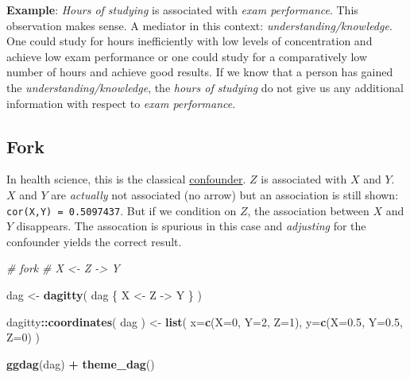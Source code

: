 \documentclass[
]{book}
\newenvironment{Shaded}{\begin{snugshade}}{\end{snugshade}}
\newcommand{\AttributeTok}[1]{\textcolor[rgb]{0.13,0.29,0.53}{#1}}
\newcommand{\CommentTok}[1]{\textcolor[rgb]{0.56,0.35,0.01}{\textit{#1}}}
\newcommand{\DecValTok}[1]{\textcolor[rgb]{0.00,0.00,0.81}{#1}}
\newcommand{\FloatTok}[1]{\textcolor[rgb]{0.00,0.00,0.81}{#1}}
\newcommand{\FunctionTok}[1]{\textcolor[rgb]{0.13,0.29,0.53}{\textbf{#1}}}
\newcommand{\NormalTok}[1]{#1}
\newcommand{\OtherTok}[1]{\textcolor[rgb]{0.56,0.35,0.01}{#1}}
\newcommand{\SpecialCharTok}[1]{\textcolor[rgb]{0.81,0.36,0.00}{\textbf{#1}}}
\newcommand{\StringTok}[1]{\textcolor[rgb]{0.31,0.60,0.02}{#1}}
\begin{document}
\textbf{Example}: \emph{Hours of studying} is associated with \emph{exam performance}.
This observation makes sense. A mediator in this context: \emph{understanding/knowledge}.
One could study for hours inefficiently with low levels of concentration
and achieve low exam performance or one could study for a comparatively
low number of hours and achieve good results. If we know that a person has gained the
\emph{understanding/knowledge}, the \emph{hours of studying} do not give us any additional
information with respect to \emph{exam performance}.

\subsection{Fork}\label{fork}

In health science, this is the classical \href{https://en.wikipedia.org/wiki/Confounding}{confounder}.
\(Z\) is associated with \(X\) and \(Y\). \(X\) and \(Y\) are \emph{actually} not associated (no arrow) but an association is
still shown: \texttt{cor(X,Y)\ =\ 0.5097437}.
But if we condition on \(Z\), the association between \(X\) and \(Y\) disappears. The assocation is
spurious in this case and \emph{adjusting} for the confounder yields the correct result.

\begin{Shaded}
\begin{Highlighting}[]
\CommentTok{\# fork}
\CommentTok{\# X \textless{}{-} Z {-}\textgreater{} Y}

\NormalTok{dag }\OtherTok{\textless{}{-}} \FunctionTok{dagitty}\NormalTok{( }\StringTok{\textquotesingle{}dag \{}
\StringTok{  X \textless{}{-} Z {-}\textgreater{} Y}
\StringTok{\}\textquotesingle{}}\NormalTok{ )}

\NormalTok{dagitty}\SpecialCharTok{::}\FunctionTok{coordinates}\NormalTok{( dag ) }\OtherTok{\textless{}{-}}
  \FunctionTok{list}\NormalTok{( }\AttributeTok{x=}\FunctionTok{c}\NormalTok{(}\AttributeTok{X=}\DecValTok{0}\NormalTok{, }\AttributeTok{Y=}\DecValTok{2}\NormalTok{, }\AttributeTok{Z=}\DecValTok{1}\NormalTok{),}
        \AttributeTok{y=}\FunctionTok{c}\NormalTok{(}\AttributeTok{X=}\FloatTok{0.5}\NormalTok{, }\AttributeTok{Y=}\FloatTok{0.5}\NormalTok{, }\AttributeTok{Z=}\DecValTok{0}\NormalTok{) )}

\FunctionTok{ggdag}\NormalTok{(dag) }\SpecialCharTok{+} \FunctionTok{theme\_dag}\NormalTok{()}
\end{Highlighting}
\end{Shaded}
\end{document}
